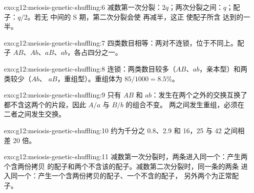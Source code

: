 \begin{solution}{exo:g12:meiosis-genetic-shuffling:6}
减数第一次分裂：$2q$；两次分裂之间：$q$；配子：$q/2$。若无
中间的 S 期，第二次分裂会使  再减半，这正
使配子所含  达到的一半。
\end{solution}

\begin{solution}{exo:g12:meiosis-genetic-shuffling:7}
四类数目相等：两对不连锁，位于不同上。配子
$AB$、$Ab$、$aB$、$ab$，各占四分之一。
\end{solution}

\begin{solution}{exo:g12:meiosis-genetic-shuffling:8}
连锁：两类数目较多（$AB$、$ab$，亲本型）和两类较少（$Ab$、
$aB$，重组型）。重组体为 $85/1000 = 8.5\%$。
\end{solution}

\begin{solution}{exo:g12:meiosis-genetic-shuffling:9}
只有 $AB$ 和 $ab$：发生在两个之外的交换互换了
都不含这两个的片段，因此 $A/a$ 与 $B/b$ 的组合不变。
两之间发生重组，必须在二者之间发生交换。
\end{solution}

\begin{solution}{exo:g12:meiosis-genetic-shuffling:10}
约为千分之 0.8、2.9 和 16，25 与 42 之间相差 20 倍。
\end{solution}

\begin{solution}{exo:g12:meiosis-genetic-shuffling:11}
减数第一次分裂时，两条进入同一个：产生两个含两份拷贝
的配子和两个不含该的配子。减数第二次分裂时，同一条的两条
进入同一个：产生一个含两份拷贝的配子、一个不含的配子，
另外两个为正常配子。
\end{solution}

